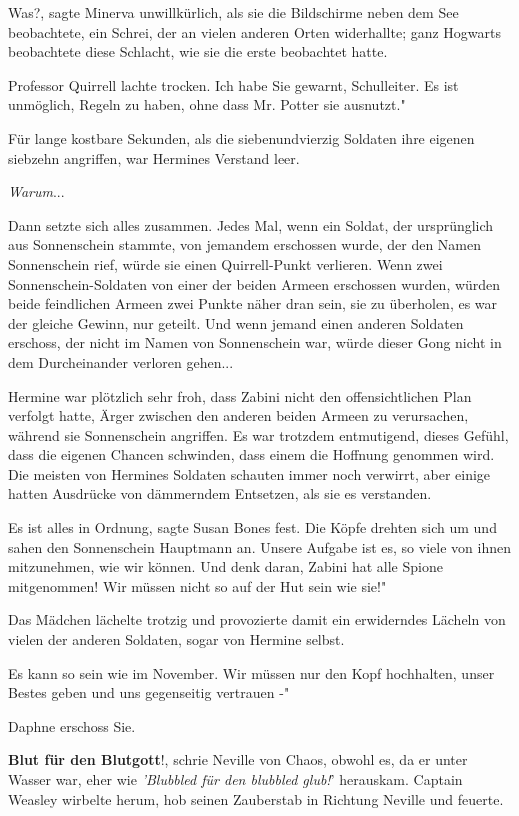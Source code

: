 \glqq Was?\grqq{}, sagte Minerva unwillkürlich, als sie die Bildschirme neben
dem See beobachtete, ein Schrei, der an vielen anderen Orten widerhallte; ganz
Hogwarts beobachtete diese Schlacht, wie sie die erste beobachtet hatte.

Professor Quirrell lachte trocken. \glqq Ich habe Sie gewarnt, Schulleiter. Es
ist unmöglich, Regeln zu haben, ohne dass Mr. Potter sie ausnutzt."

Für lange kostbare Sekunden, als die siebenundvierzig Soldaten ihre eigenen
siebzehn angriffen, war Hermines Verstand leer.

\emph{Warum}...

Dann setzte sich alles zusammen. Jedes Mal, wenn ein Soldat, der ursprünglich
aus Sonnenschein stammte, von jemandem erschossen wurde, der den Namen
Sonnenschein rief, würde sie einen Quirrell-Punkt verlieren. Wenn zwei
Sonnenschein-Soldaten von einer der beiden Armeen erschossen wurden, würden
beide feindlichen Armeen zwei Punkte näher dran sein, sie zu überholen, es war
der gleiche Gewinn, nur geteilt. Und wenn jemand einen anderen Soldaten
erschoss, der nicht im Namen von Sonnenschein war, würde dieser Gong nicht in
dem Durcheinander verloren gehen...

Hermine war plötzlich sehr froh, dass Zabini nicht den offensichtlichen Plan
verfolgt hatte, Ärger zwischen den anderen beiden Armeen zu verursachen, während
sie Sonnenschein angriffen. Es war trotzdem entmutigend, dieses Gefühl, dass die
eigenen Chancen schwinden, dass einem die Hoffnung genommen wird. Die meisten
von Hermines Soldaten schauten immer noch verwirrt, aber einige hatten Ausdrücke
von dämmerndem Entsetzen, als sie es verstanden.

\glqq Es ist alles in Ordnung\grqq{}, sagte Susan Bones fest. Die Köpfe drehten
sich um und sahen den Sonnenschein Hauptmann an. \glqq Unsere Aufgabe ist es, so
viele von ihnen mitzunehmen, wie wir können. Und denk daran, Zabini hat alle
Spione mitgenommen! Wir müssen nicht so auf der Hut sein wie sie!"

Das Mädchen lächelte trotzig und provozierte damit ein erwiderndes Lächeln von
vielen der anderen Soldaten, sogar von Hermine selbst.

\glqq Es kann so sein wie im November. Wir müssen nur den Kopf hochhalten, unser
Bestes geben und uns gegenseitig vertrauen -"

Daphne erschoss Sie.

\glqq \textbf{Blut für den Blutgott}!\grqq{}, schrie Neville von Chaos, obwohl
es, da er unter Wasser war, eher wie \emph{'Blubbled für den blubbled glub!}'
herauskam. Captain Weasley wirbelte herum, hob seinen Zauberstab in Richtung
Neville und feuerte.

